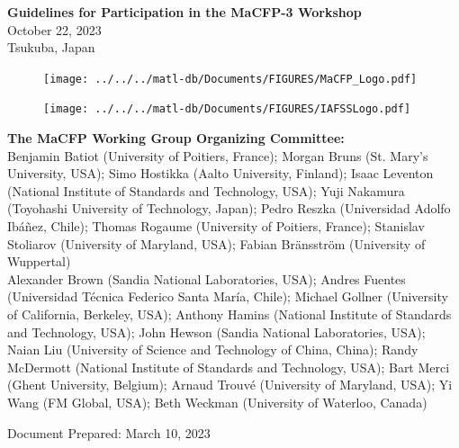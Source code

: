 \documentclass[12pt]{article}
\begin{document}

\thispagestyle{empty}

\begin{center}
{\bf\Large Guidelines for Participation in the MaCFP-3 Workshop} \\
{\large October 22, 2023\\Tsukuba, Japan}
\end{center}

\begin{figure}[h]
  \centering
  \texttt{[image: ../../../matl-db/Documents/FIGURES/MaCFP\_Logo.pdf]}
  \label{Cover_Image}
\end{figure}

\vfill

\begin{minipage}{0.25\textwidth}
\begin{figure}[H]
\texttt{[image: ../../../matl-db/Documents/FIGURES/IAFSSLogo.pdf]}
\end{figure}
\end{minipage} \hfill
\begin{minipage}{0.65\textwidth}
\begin{flushright}
\begin{small}
{\bf The MaCFP Working Group Organizing Committee:} \\
{\footnotesize Benjamin Batiot (University of Poitiers, France); Morgan Bruns (St. Mary's University, USA); Simo Hostikka (Aalto University, Finland); Isaac Leventon (National Institute of Standards and Technology, USA); Yuji Nakamura (Toyohashi University of Technology, Japan); Pedro Reszka (Universidad Adolfo Ibáñez, Chile); Thomas Rogaume (University of Poitiers, France); Stanislav Stoliarov (University of Maryland, USA); Fabian Bränsström (University of Wuppertal)}\\
{\footnotesize Alexander Brown (Sandia National Laboratories, USA); Andres Fuentes (Universidad Técnica Federico Santa María, Chile); Michael Gollner (University of California, Berkeley, USA); Anthony Hamins (National Institute of Standards and Technology, USA); John Hewson (Sandia National Laboratories, USA); Naian Liu (University of Science and Technology of China, China); Randy McDermott (National Institute of Standards and Technology, USA); Bart Merci (Ghent University, Belgium); Arnaud Trouvé (University of Maryland, USA); Yi Wang (FM Global, USA); Beth Weckman (University of Waterloo, Canada)}


\end{small}
\end{flushright}
\end{minipage}
\begin{small}
Document Prepared: March 10, 2023\\
\end{small}
\newpage
\thispagestyle{empty}
\tableofcontents
\end{document}
